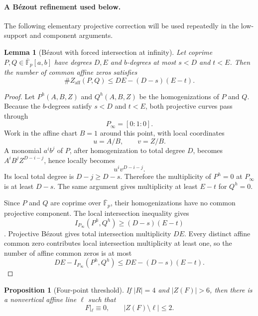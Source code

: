 \documentclass[11pt]{article}
\newtheorem{proposition}[theorem]{Proposition}
\newtheorem{lemma}[theorem]{Lemma}
\newcommand{\F}{\mathbb F}
\begin{document}
\paragraph{A B\'ezout refinement used below.}
The following elementary projective correction will be used repeatedly in the low-support and component arguments.

\begin{lemma}[B\'ezout with forced intersection at infinity]
\label{lem:bezout-infinity}
Let coprime $P,Q\in\overline{\F}_p[a,b]$ have degrees $D,E$ and $b$-degrees at most $s<D$ and $t<E$.  Then the number of common affine zeros satisfies
\begin{equation}
 \#Z_{\mathrm{aff}}(P,Q)
 \le DE-(D-s)(E-t).
 \label{eq:bezout-infinity}
\end{equation}
\end{lemma}

\begin{proof}
Let \(P^h(A,B,Z)\) and \(Q^h(A,B,Z)\) be the homogenizations of \(P\) and
\(Q\).  Because the \(b\)-degrees satisfy \(s<D\) and \(t<E\), both
projective curves pass through
\[
 P_\infty=[0:1:0].
\]
Work in the affine chart \(B=1\) around this point, with local coordinates
\[
 u=A/B,
 \qquad
 v=Z/B.
\]
A monomial \(a^ib^j\) of \(P\), after homogenization to total degree \(D\),
becomes \(A^iB^jZ^{D-i-j}\), hence locally becomes
\[
 u^iv^{D-i-j}.
\]
Its local total degree is \(D-j\ge D-s\).  Therefore the multiplicity of
\(P^h=0\) at \(P_\infty\) is at least \(D-s\).  The same argument gives
multiplicity at least \(E-t\) for \(Q^h=0\).

Since \(P\) and \(Q\) are coprime over \(\overline{\F}_p\), their
homogenizations have no common projective component.  The local intersection
inequality gives
\[
 I_{P_\infty}(P^h,Q^h)\ge(D-s)(E-t)
\]
\cite[Sec.~3.3]{FultonCurves}.  Projective B\'ezout gives total intersection
multiplicity \(DE\).  Every distinct affine common zero contributes local
intersection multiplicity at least one, so the number of affine common zeros
is at most
\[
 DE-I_{P_\infty}(P^h,Q^h)
 \le DE-(D-s)(E-t).
\]
\end{proof}


\begin{proposition}[Four-point threshold]
\label{prop:four-point-large-zero-structure}
If $|R|=4$ and $|Z(F)|>6$, then there is a nonvertical affine line $\ell$ such that
\[
 F|_\ell\equiv0,
 \qquad
 |Z(F)\setminus\ell|\le2.
\]
\end{proposition}
\end{document}
